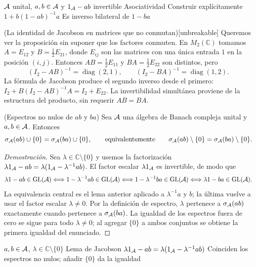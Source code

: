 \proofdiagram
{$\mathcal A$ unital, $a,b\in\mathcal A$ y $1_\mathcal A-ab$ invertible}
{Asociatividad}
{Construir explícitamente $1+b(1-ab)^{-1}a$}
{Es inverso bilateral de $1-ba$}

\begin{cthejemplo}{(La identidad de Jacobson en matrices que no conmutan)}[unbreakable]
Queremos ver la proposición sin suponer que los factores conmuten.
En $M_2(\mathbb C)$ tomamos $A=E_{12}$ y
$B=\frac12E_{21}$, donde $E_{ij}$ son las matrices con una
única entrada $1$ en la posición $(i,j)$. Entonces
$AB=\frac12E_{11}$ y $BA=\frac12E_{22}$ son distintos, pero
\[
 (I_2-AB)^{-1}=\operatorname{diag}(2,1),\qquad
 (I_2-BA)^{-1}=\operatorname{diag}(1,2).
\]
La fórmula de Jacobson produce el segundo inverso desde el primero:
$I_2+B(I_2-AB)^{-1}A=I_2+E_{22}$.
La invertibilidad simultánea proviene de la estructura del producto,
sin requerir $AB=BA$.
\end{cthejemplo}

\begin{cthcorolario}{(Espectros no nulos de $ab$ y $ba$)}
Sea $\mathcal A$ una álgebra de Banach compleja unital y $a,b\in\mathcal A$.
Entonces
\[
 \sigma_\mathcal A(ab)\cup\{0\}=\sigma_\mathcal A(ba)\cup\{0\},
 \qquad\text{equivalentemente}\qquad
 \sigma_\mathcal A(ab)\setminus\{0\}=\sigma_\mathcal A(ba)\setminus\{0\}.
\]
\end{cthcorolario}

\begin{proof}[Demostración]
Sea $\lambda\in\mathbb C\setminus\{0\}$ y usemos
la factorización
$\lambda1_\mathcal A-ab=\lambda(1_\mathcal A-\lambda^{-1}ab)$.
El factor escalar $\lambda1_\mathcal A$ es invertible, de modo que
\[
\lambda1-ab\in\operatorname{GL}(\mathcal A)
\Longleftrightarrow
1-\lambda^{-1}ab\in\operatorname{GL}(\mathcal A)
\Longleftrightarrow
1-\lambda^{-1}ba\in\operatorname{GL}(\mathcal A)
\Longleftrightarrow
\lambda1-ba\in\operatorname{GL}(\mathcal A).
\]
La equivalencia central es el lema anterior aplicado a
$\lambda^{-1}a$ y $b$; la última vuelve a usar el factor escalar
$\lambda\ne0$. Por la definición de espectro, $\lambda$ pertenece
a $\sigma_\mathcal A(ab)$ exactamente cuando pertenece a
$\sigma_\mathcal A(ba)$. La igualdad de los espectros fuera de cero se
sigue para todo $\lambda\ne0$; al agregar $\{0\}$ a ambos
conjuntos se obtiene la primera igualdad del enunciado.
\end{proof}

\proofdiagram
{$a,b\in\mathcal A$, $\lambda\in\mathbb C\setminus\{0\}$}
{Lema de Jacobson}
{$\lambda1_\mathcal A-ab=\lambda(1_\mathcal A-\lambda^{-1}ab)$}
{Coinciden los espectros no nulos; añadir $\{0\}$ da la igualdad}

